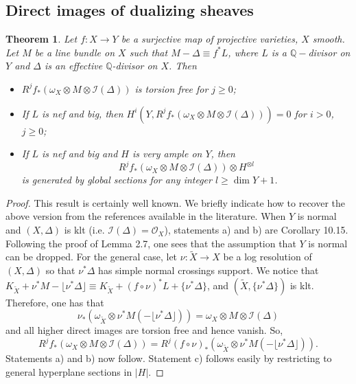 \documentclass[10pt, a4paper]{amsart}
\newtheorem{thm}{Theorem}[section]
\newcommand\lra{\longrightarrow}
\newcommand\ot{{\otimes}}
\newcommand\OO{{\mathcal{O}}}
\newcommand\Q{{\mathbb{Q}}}
\newcommand\II{{\mathcal{I}}}
\begin{document}
\subsection{Direct images of dualizing sheaves}\label{dualizing}
\begin{thm} \label{omegavan}Let $f\colon X\to  Y$ be a  surjective 
map of projective
varieties, $X$ smooth. Let $M$ be a line bundle on $X$
such that $M-\Delta \equiv f^* L $, where $L$
is a $\Q-$divisor on $Y$ and $\Delta $ is an effective $\Q$-divisor on $X$. 
Then
\begin{itemize}
\item[a)] $R^jf_*(\omega _X\ot M\ot \II (\Delta )) $ 
is torsion free for $j\geq 0$;

\item[b)] If $L$ is nef and big, then $H^i(Y,R^jf_*(\omega _X\ot M
\ot \II (\Delta )))
=0$ for $i>0$, $j\geq 0$;

\item[c)] If $L$ is nef and big and $H$ is very ample on $Y$, 
then $$R^jf_*(\omega _X \ot M\ot \II (\Delta ))\ot H^{\ot l}$$ is generated
by global sections for any integer $l\geq \dim Y +1$.
\end{itemize}
\end{thm}
\begin{proof} This result is certainly well known. We briefly indicate
how to recover the above version from the references available in the 
literature. When $Y$ is normal and $(X,\Delta)$ is klt (i.e.
$\II (\Delta )=\OO _X$), statements a) and  b)
are \cite{Ko1} 
Corollary 10.15. Following the proof of \cite{HP} Lemma 2.7,
one sees that the assumption that $Y$ is normal can be dropped.
For the general case, let $\nu :\tilde{X}\lra X$ be a log resolution
of $(X,\Delta)$ so that $\nu ^* \Delta$ has simple normal crossings support.
We notice that $K_ {\tilde{X}}+\nu ^* M -\lfloor \nu ^* \Delta
\rfloor \equiv K_ {\tilde{X}}+(f \circ \nu)^*L+\{\nu ^* \Delta \}$,
and $(\tilde{X}, \{\nu ^* \Delta \})$ is klt.
Therefore, one has that $$\nu _*(\omega _{\tilde{X}}\ot \nu ^* M(-\lfloor \nu ^* \Delta
\rfloor ))=\omega _X \ot M \ot \II (\Delta )$$
and all higher direct images are torsion free and hence vanish.
So, $$R^jf_*(\omega _X\ot M\ot \II (\Delta ))=
R^j(f \circ \nu)_*(\omega _{\tilde{X}}\ot \nu ^* M(-\lfloor \nu ^* \Delta
\rfloor )).$$
Statements a) and b) now follow.
Statement c) follows easily by restricting to general hyperplane sections in
$|H|$.
\end{proof}
\end{document}

